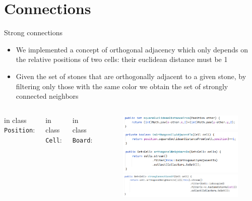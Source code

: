 \documentclass{beamer}
\begin{document}
\section{Connections}

\begin{frame}{Strong connections}
	\begin{itemize}
		\item We implemented a concept of orthogonal adjacency which only depends on the relative positions of two cells: their euclidean distance must be 1
		\item Given the set of stones that are orthogonally adjacent to a given stone, by filtering only those with the same color we obtain the set of strongly connected neighbors
	\end{itemize}

\begin{columns}
	in class \texttt{Position}:
	
	  \vspace{0.9cm}
	in class \texttt{Cell}:
	
	  \vspace{0.9cm}
	in class \texttt{Board}:


\begin{figure}
	\includegraphics[scale=0.2]{images/connections-position.png}
	
  \vspace{0.2cm}
	\includegraphics[scale=0.2]{images/connections-cell.png}

  \vspace{0.2cm}
	\includegraphics[scale=0.2]{images/connections-board.png}
\end{figure}
\end{columns}

	
\end{frame}
\end{document}
